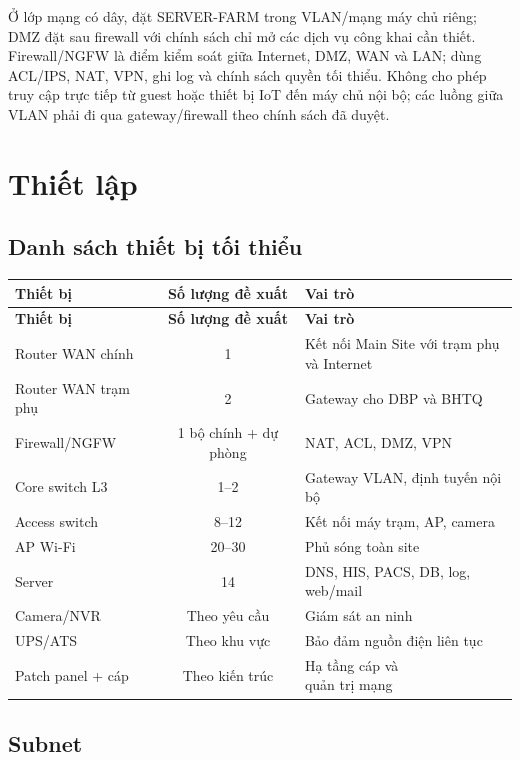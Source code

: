 Ở lớp mạng có dây, đặt SERVER-FARM trong VLAN/mạng máy chủ riêng; DMZ đặt sau firewall với chính sách chỉ mở các dịch vụ công khai cần thiết. Firewall/NGFW là điểm kiểm soát giữa Internet, DMZ, WAN và LAN; dùng ACL/IPS, NAT, VPN, ghi log và chính sách quyền tối thiểu. Không cho phép truy cập trực tiếp từ guest hoặc thiết bị IoT đến máy chủ nội bộ; các luồng giữa VLAN phải đi qua gateway/firewall theo chính sách đã duyệt.

\clearpage

\section{Thiết lập}

\subsection{Danh sách thiết bị tối thiểu}

\begin{longtable}{@{}|l|c|l|@{}}
\hline
\textbf{Thiết bị} & \textbf{Số lượng đề xuất} & \textbf{Vai trò} \\
\hline
\endfirsthead
\hline
\textbf{Thiết bị} & \textbf{Số lượng đề xuất} & \textbf{Vai trò} \\
\hline
\endhead
Router WAN chính & 1 & \shortstack[l]{Kết nối Main Site với trạm phụ\\và Internet} \\
Router WAN trạm phụ & 2 & Gateway cho DBP và BHTQ \\
Firewall/NGFW & 1 bộ chính + dự phòng & NAT, ACL, DMZ, VPN \\
Core switch L3 & 1--2 & Gateway VLAN, định tuyến nội bộ \\
Access switch & 8--12 & Kết nối máy trạm, AP, camera \\
AP Wi-Fi & 20--30 & Phủ sóng toàn site \\
Server & 14 & DNS, HIS, PACS, DB, log, web/mail \\
Camera/NVR & Theo yêu cầu & Giám sát an ninh \\
UPS/ATS & Theo khu vực & Bảo đảm nguồn điện liên tục \\
Patch panel + cáp & Theo kiến trúc & \shortstack[l]{Hạ tầng cáp và\\quản trị mạng} \\
\hline
\end{longtable}
\clearpage

\subsection{Subnet}

